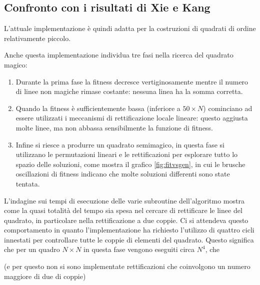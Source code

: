 \documentclass[italian,twoside,twocolumn]{article}
\begin{document}
\subsection{Confronto con i risultati di Xie e Kang}

L'attuale implementazione è quindi adatta per la costruzioni di quadrati di ordine relativamente piccolo.

Anche questa implementazione individua tre fasi nella ricerca del quadrato magico:
\begin{enumerate}
	\item Durante la prima fase la fitness decresce vertiginosamente mentre il numero di linee non magiche rimase costante: nessuna linea ha la somma corretta.
	\item Quando la fitness è sufficientemente bassa (inferiore a $ 50 \times N $) cominciano ad essere utilizzati i meccanismi di rettificazione locale lineare: questo aggiusta molte linee, ma non abbassa sensibilmente la funzione di fitness.
	\item Infine si riesce a produrre un quadrato semimagico, in questa fase si utilizzano le permutazioni lineari e le rettificazioni per esplorare tutto lo spazio delle soluzioni, come mostra il grafico \ref{fig:fitvsgen}, in cui le brusche oscillazioni di fitness indicano che molte soluzioni differenti sono state tentata. 
\end{enumerate}


L'indagine sui tempi di esecuzione delle varie subroutine dell'algoritmo mostra come la quasi totalità del tempo sia spesa nel cercare di rettificare le linee del quadrato, in particolare nella rettificazione a due coppie. Ci si attendeva questo comportamento in quanto l'implementazione ha richiesto l'utilizzo di quattro cicli innestati per controllare tutte le coppie di elementi del quadrato. Questo significa che per un quadro $ N\times N $ in questa fase vengono eseguiti circa $ N^4 $, che 


 (e per questo non si sono implementate rettificazioni che coinvolgono un numero maggiore di due di coppie)
\end{document}
